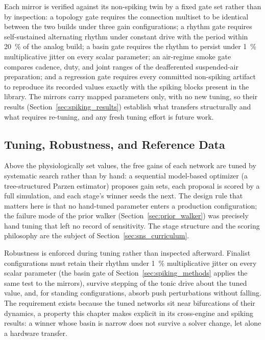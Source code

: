 Each mirror is verified against its non-spiking twin by a fixed gate set rather than by inspection: a topology gate requires the connection multiset to be identical between the two builds under three gain configurations; a rhythm gate requires self-sustained alternating rhythm under constant drive with the period within \qty{20}{\percent} of the analog build; a basin gate requires the rhythm to persist under \qty{1}{\percent} multiplicative jitter on every scalar parameter; an air-regime smoke gate compares cadence, duty, and joint ranges of the deafferented suspended-air preparation; and a regression gate requires every committed non-spiking artifact to reproduce its recorded values exactly with the spiking blocks present in the library. The mirrors carry mapped parameters only, with no new tuning, so their results (Section~\ref{sec:spiking_results}) establish what transfers structurally and what requires re-tuning, and any fresh tuning effort is future work.

\subsection{Tuning, Robustness, and Reference Data}\label{sec:sns_tuning_methods}

Above the physiologically set values, the free gains of each network are tuned by systematic search rather than by hand: a sequential model-based optimizer (a tree-structured Parzen estimator) proposes gain sets, each proposal is scored by a full simulation, and each stage's winner seeds the next. The design rule that matters here is that no hand-tuned parameter enters a production configuration; the failure mode of the prior walker (Section~\ref{sec:prior_walker}) was precisely hand tuning that left no record of sensitivity. The stage structure and the scoring philosophy are the subject of Section~\ref{sec:sns_curriculum}.

Robustness is enforced during tuning rather than inspected afterward. Finalist configurations must retain their rhythm under \qty{1}{\percent} multiplicative jitter on every scalar parameter (the basin gate of Section~\ref{sec:spiking_methods} applies the same test to the mirrors), survive stepping of the tonic drive about the tuned value, and, for standing configurations, absorb push perturbations without falling. The requirement exists because the tuned networks sit near bifurcations of their dynamics, a property this chapter makes explicit in its cross-engine and spiking results: a winner whose basin is narrow does not survive a solver change, let alone a hardware transfer.

